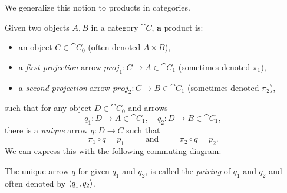 \documentclass{scrartcl}
\newenvironment{diags}[1][0pt]{\begin{center}\vspace{#1}%
    \def\diagsspaceafter{#1}}{%
    \vspace{\diagsspaceafter}\end{center}}
\begin{document}
We generalize this notion to products in categories.

\begin{definition}[Product]
  Given two objects $A, B$ in a category $\cat{C}$, \textbf{a} product is:
  \begin{itemize}
  \item an object $C \in \cat{C}_0$ (often denoted $A \times B$),
  \item a \emph{first projection} arrow $proj_1 \colon C \to A \in
    \cat{C}_1$ (sometimes denoted $\pi_1$),
  \item a \emph{second projection} arrow $proj_2 \colon C \to B \in
    \cat{C}_1$ (sometimes denoted $\pi_2$),
  \end{itemize}
  such that for any object $D \in \cat{C}_0$ and arrows
  \[
  q_1 \colon D \to A \in \cat{C}_1, \quad q_2 \colon D \to B \in \cat{C}_1,
  \]
  there is a \emph{unique} arrow $q \colon D \to C$ such that
  \[
  \pi_1 \circ q = p_1 \ \qquad \text{ and } \qquad \ \pi_2 \circ q = p_2.
  \]
  We can express this with the following commuting diagram:
  \begin{diags}
  \end{diags}
  The unique arrow $q$ for given $q_1$ and $q_2$, is called the
  \emph{pairing} of $q_1$ and $q_2$ and often denoted by
  $\langle q_1, q_2 \rangle$.
\end{definition}
\end{document}
